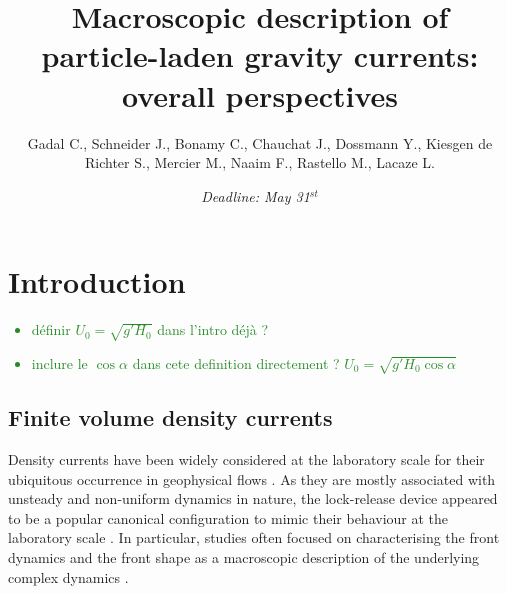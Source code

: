 \documentclass[twocolumn]{article}
\title{Macroscopic description of particle-laden gravity currents: overall perspectives}
\author{Gadal C., Schneider J., Bonamy C., Chauchat J., Dossmann Y., Kiesgen de Richter S., Mercier M., Naaim F., Rastello M., Lacaze L.}
\date{{\it\color{red}Deadline: May 31$^{st}$}}
\newcommand*{\cyril}{\textcolor{ForestGreen}}
\begin{document}

\section{Introduction}
\label{sec:intro}

\cyril{
	\begin{itemize}
		\item définir $U_{0} = \sqrt{g' H_{0}}$ dans l'intro déjà ?
		\item inclure le $\cos\alpha$ dans cete definition directement ? $U_{0} = \sqrt{g' H_{0} \cos\alpha}$
	\end{itemize}
}

\subsection{Finite volume density currents}

Density currents have been widely considered at the laboratory scale for their ubiquitous occurrence in geophysical flows \citep{Hopfinger1983,Simpson1999,Dufek2016}. As they are mostly associated with unsteady and non-uniform dynamics in nature, the lock-release device appeared to be a popular canonical configuration to mimic their behaviour at the laboratory scale \citep{Hacker1996,Shin2004,Nogueira2014}. In particular, studies often focused on characterising the front dynamics and the front shape as a macroscopic description of the underlying complex dynamics \citep{Rottman1983,Marino2005,Hogg2006}.
\end{document}
